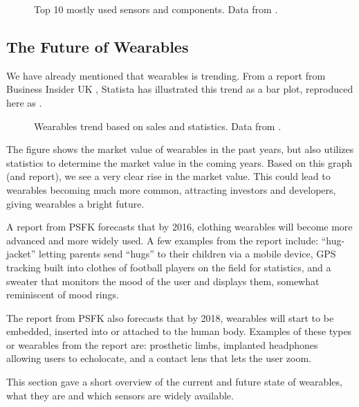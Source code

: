 \begin{figure}[!htb]
    \centering
    
    \caption{Top 10 mostly used sensors and components. Data from \protect\cite{LISTOFWEARABLES}.}
    \label{fig:wearables-sensors}
\end{figure}

\subsection{The Future of Wearables}
We have already mentioned that wearables is trending. 
From a report from Business Insider UK \cite{WEARABLESTREND}, 
Statista \cite{WEARABLESTRENDNUMBERS} has illustrated this trend as a bar plot, 
reproduced here as .

\begin{figure}[!htb]
  \centering
  
  \caption{Wearables trend based on sales and statistics. Data from \protect\cite{WEARABLESTRENDNUMBERS}.}
  \label{fig:wearables-trend}
\end{figure}

The figure shows the market value of wearables in the past years, 
but also utilizes statistics to determine the market value in the coming years. 
Based on this graph (and report), 
we see a very clear rise in the market value. 
This could lead to wearables becoming much more common,
attracting investors and developers, 
giving wearables a bright future. 

A report from PSFK \cite{PSFK} forecasts that by 2016, 
clothing wearables will become more advanced and more widely used. 
A few examples from the report include: 
``hug-jacket'' letting parents send ``hugs'' to their children via a mobile device, 
GPS tracking built into clothes of football players on the field for statistics, 
and a sweater that monitors the mood of the user and displays them, somewhat reminiscent of mood rings.

The report from PSFK also forecasts that by 2018, 
wearables will start to be embedded, \ie inserted into or attached to the human body. 
Examples of these types or wearables from the report are: 
prosthetic limbs, implanted headphones allowing users to echolocate, 
and a contact lens that lets the user zoom.

This section gave a short overview of the current and future state of wearables, 
what they are and which sensors are widely available. 

